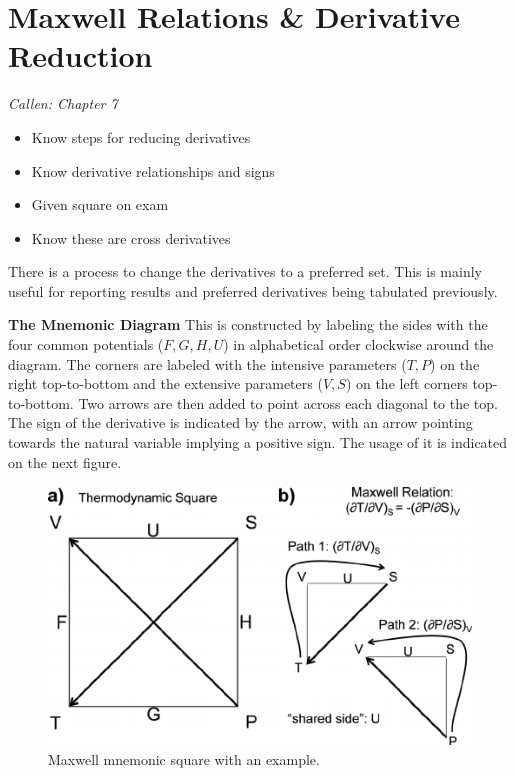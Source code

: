 \section{Maxwell Relations \& Derivative Reduction}

\emph{Callen: Chapter 7}
\begin{itemize}
    \item Know steps for reducing derivatives
    \item Know derivative relationships and signs
    \item Given square on exam
    \item Know these are cross derivatives
\end{itemize}
There is a process to change the derivatives to a preferred set. This is mainly useful for reporting results and preferred derivatives being tabulated previously.


\textbf{The Mnemonic Diagram}
This is constructed by labeling the sides with the four common potentials ($F,G,H,U$) in alphabetical order clockwise around the diagram. The corners are labeled with the intensive parameters ($T,P$) on the right top-to-bottom and the extensive parameters ($V,S$) on the left corners top-to-bottom. Two arrows are then added to point across each diagonal to the top. The sign of the derivative is indicated by the arrow, with an arrow pointing towards the natural variable implying a positive sign. The usage of it is indicated on the next figure.

\begin{figure}[!hbtp]
    \centering
    \includegraphics[scale=0.33]{Images/maxwell-square.png}
    \caption{Maxwell mnemonic square with an example.}
    \label{fig:maxwell}
\end{figure}

